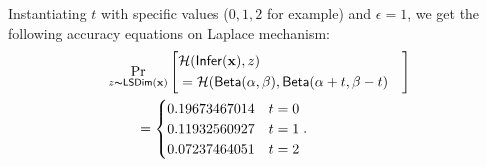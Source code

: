 \documentclass{article}
\begin{document}
Instantiating $t$ with specific values ($0,1,2$ for example) and $\epsilon = 1$, we get the following accuracy equations on Laplace mechanism:
\begin{align*}
&\lapmechPr{\dataobs}{
\begin{aligned}
\lefteqn{\hellinger(\bysinfer(\dataobs), z )}\\ 
&= \hellinger(\betad(\alpha, \beta), \betad(\alpha + t, \beta - t)
\end{aligned}
}\\
& \qquad = \begin{cases}
0.19673467014 & t = 0\\
0.11932560927 & t = 1\\
0.07237464051 & t = 2
\end{cases}.
\end{align*}
\end{document}

